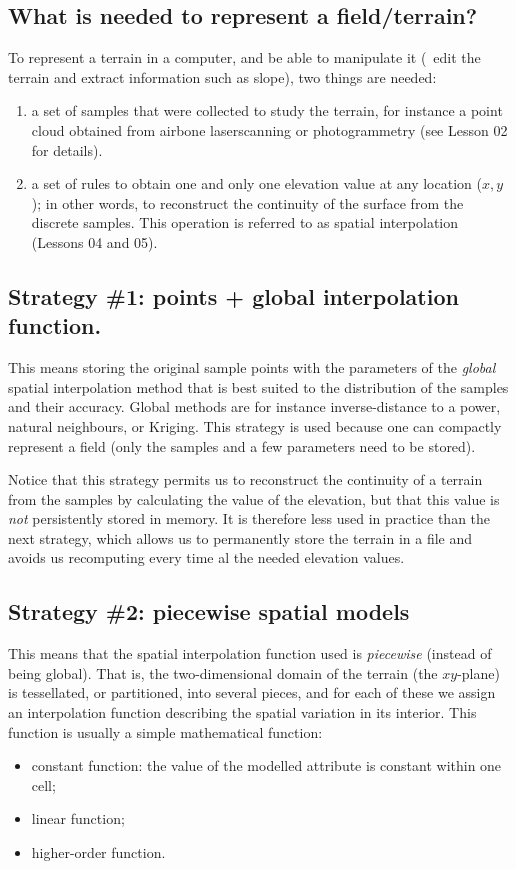 \subsection{What is needed to represent a field/terrain?}

To represent a terrain in a computer, and be able to manipulate it (\ie\ edit the terrain and extract information such as slope), two things are needed:
\begin{enumerate}
  \item a set of samples that were collected to study the terrain, for instance a point cloud obtained from airbone laserscanning or photogrammetry (see Lesson 02 for details).
  \item a set of rules to obtain one and only one elevation value at any location ($x,y$); in other words, to reconstruct the continuity of the surface from the discrete samples.
  This operation is referred to as spatial interpolation (Lessons 04 and 05). 
\end{enumerate}


\subsection{Strategy \#1: points + global interpolation function.}
This means storing the original sample points with the parameters of the \emph{global} spatial interpolation method that is best suited to the distribution of the samples and their accuracy.
Global methods are for instance inverse-distance to a power, natural neighbours, or Kriging.
This strategy is used because one can compactly represent a field (only the samples and a few parameters need to be stored).

Notice that this strategy permits us to reconstruct the continuity of a terrain from the samples by calculating the value of the elevation, but that this value is \emph{not} persistently stored in memory.
It is therefore less used in practice than the next strategy, which allows us to permanently store the terrain in a file and avoids us recomputing every time al the needed elevation values.


\subsection{Strategy \#2: piecewise spatial models}
This means that the spatial interpolation function used is \emph{piecewise} (instead of being global).
That is, the two-dimensional domain of the terrain (the $xy$-plane) is tessellated, or partitioned, into several pieces, and for each of these we assign an interpolation function describing the spatial variation in its interior.
This function is usually a simple mathematical function:
\begin{itemize}
  \item constant function: the value of the modelled attribute is constant within one cell;
  \item linear function;
  \item higher-order function.
\end{itemize}

